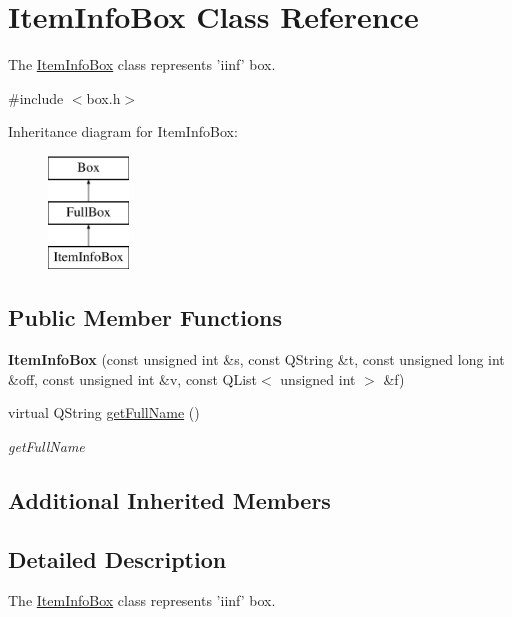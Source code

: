 \hypertarget{class_item_info_box}{\section{Item\-Info\-Box Class Reference}
\label{class_item_info_box}
}


The \hyperlink{class_item_info_box}{Item\-Info\-Box} class represents 'iinf' box.  




{\ttfamily \#include $<$box.\-h$>$}

Inheritance diagram for Item\-Info\-Box\-:\begin{figure}[H]
\begin{center}
\leavevmode
\includegraphics[height=3.000000cm]{class_item_info_box}
\end{center}
\end{figure}
\subsection*{Public Member Functions}
\begin{DoxyCompactItemize}
\item 
\hypertarget{class_item_info_box_a8325c989bebeace0d276f118b95705e0}{{\bfseries Item\-Info\-Box} (const unsigned int \&s, const Q\-String \&t, const unsigned long int \&off, const unsigned int \&v, const Q\-List$<$ unsigned int $>$ \&f)}\label{class_item_info_box_a8325c989bebeace0d276f118b95705e0}

\item 
virtual Q\-String \hyperlink{class_item_info_box_acc8b801d684beee63b12ea00aa84b1d4}{get\-Full\-Name} ()
\begin{DoxyCompactList}\small\item\em get\-Full\-Name \end{DoxyCompactList}\end{DoxyCompactItemize}
\subsection*{Additional Inherited Members}


\subsection{Detailed Description}
The \hyperlink{class_item_info_box}{Item\-Info\-Box} class represents 'iinf' box. 

